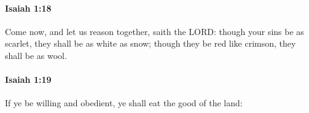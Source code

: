 		\paragraph{Isaiah 1:18} %
			\label{ISAIAH-1-18}

			Come now, and let us reason together, saith the LORD: though your sins be as scarlet, they shall be as white as snow; though they be red like crimson, they shall be as wool.


		\paragraph{Isaiah 1:19} %
			\label{ISAIAH-1-19}

			If ye be willing and obedient, ye shall eat the good of the land:


